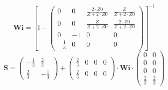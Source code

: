 \[ \mathbf{Wi} =  \left[ \mathbb{I}  - \left(\begin{array}{cccc} 0 & 0
& \frac{2\cdot Z0}{Z+2\cdot Z0} & \frac{Z}{Z+2\cdot Z0} \\ 0 & 0 &
\frac{Z}{Z+2\cdot Z0} & \frac{2\cdot Z0}{Z+2\cdot Z0} \\ 0 & -1 & 0 &
0 \\ -\frac{1}{3} & 0 & 0 & 0 \end{array}\right) \right]^{-1}  \]
\[ \mathbf{S} = \left(\begin{array}{cc} -\frac{1}{3} & \frac{2}{3} \\
\frac{2}{3} & -\frac{1}{3} \end{array}\right) +
\left(\begin{array}{cccc} \frac{2}{3} & 0 & 0 & 0 \\ \frac{2}{3} & 0 &
0 & 0 \end{array}\right) \cdot \mathbf{Wi}
\cdot\left(\begin{array}{cc} 0 & 0 \\ 0 & 0 \\ 0 & 0 \\ \frac{2}{3} &
\frac{2}{3} \end{array}\right) \]
